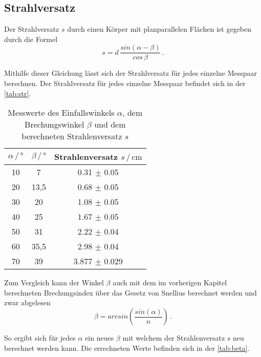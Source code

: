 \subsection{Strahlversatz}
Der Strahlversatz $s$ durch einen Körper mit planparallelen Flächen ist gegeben durch die Formel
\begin{equation}
    s = d \, \frac{sin(\alpha - \beta)}{cos \, \beta} \, .
\end{equation}

\noindent
Mithilfe dieser Gleichung lässt sich der Strahlversatz für jedes einzelne Messpaar berechnen. Der Strahlversatz für jedes einzelne Messpaar 
befindet sich in der \autoref{tab:str}.

\begin{table}
    \centering
    \caption{Messwerte des Einfallswinkels $\alpha$, dem Brechungswinkel $\beta$ und dem berechneten Strahlenversatz $s$}
    \label{tab:str}
    \begin{tabular}{c c c}
    \toprule
         $\alpha \, / \, ° $ & $\beta \, / \, °$ & Strahlenversatz $s  \, / \, \si{\centi\meter}$\\
    \midrule
    10 & 7    & 0.31  $\pm$  0.05\\
    20 & 13,5 & 0.68  $\pm$  0.05\\
    30 & 20   & 1.08  $\pm$  0.05\\
    40 & 25   & 1.67  $\pm$  0.05\\
    50 & 31   & 2.22  $\pm$  0.04\\
    60 & 35,5 & 2.98  $\pm$  0.04\\
    70 & 39   & 3.877 $\pm$  0.029\\
    \bottomrule
    \end{tabular}
\end{table}

\noindent
Zum Vergleich kann der Winkel $\beta$ auch mit dem im vorherigen Kapitel berechneten Brechungsindex über das Gesetz von Snellius berechnet werden und zwar abgelesen
\begin{equation}
    \beta = arcsin\left(\frac{sin(\alpha)}{n}\right) \, .
\end{equation}

\noindent
So ergibt sich für jedes $\alpha$ ein neues $\beta$ mit welchem der Strahlenversatz $s$ neu berechnet werden kann. Die errechneten Werte befinden sich in der \autoref{tab:beta}.

